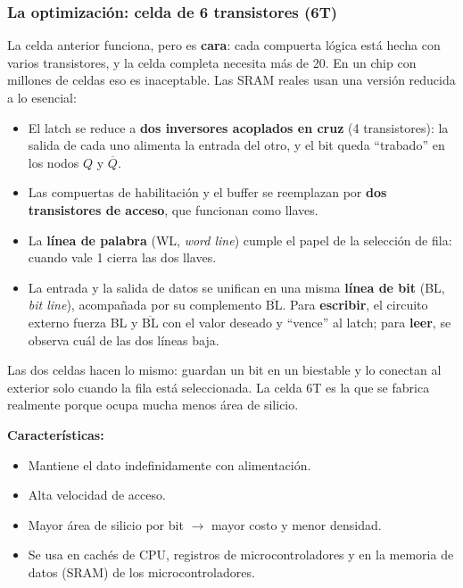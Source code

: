 
\subsubsection{La optimización: celda de 6 transistores (6T)}

La celda anterior funciona, pero es \textbf{cara}: cada compuerta lógica está hecha con varios transistores, y la celda completa necesita más de 20. En un chip con millones de celdas eso es inaceptable. Las SRAM reales usan una versión reducida a lo esencial:

\begin{itemize}
  \item El latch se reduce a \textbf{dos inversores acoplados en cruz} (4 transistores): la salida de cada uno alimenta la entrada del otro, y el bit queda ``trabado'' en los nodos $Q$ y $\overline{Q}$.
  \item Las compuertas de habilitación y el buffer se reemplazan por \textbf{dos transistores de acceso}, que funcionan como llaves.
  \item La \textbf{línea de palabra} (WL, \emph{word line}) cumple el papel de la selección de fila: cuando vale 1 cierra las dos llaves.
  \item La entrada y la salida de datos se unifican en una misma \textbf{línea de bit} (BL, \emph{bit line}), acompañada por su complemento $\overline{\text{BL}}$. Para \textbf{escribir}, el circuito externo fuerza BL y $\overline{\text{BL}}$ con el valor deseado y ``vence'' al latch; para \textbf{leer}, se observa cuál de las dos líneas baja.
\end{itemize}


\begin{notabox}
Las dos celdas hacen lo mismo: guardan un bit en un biestable y lo conectan al exterior solo cuando la fila está seleccionada. La celda 6T es la que se fabrica realmente porque ocupa mucha menos área de silicio.
\end{notabox}

\textbf{Características:}
\begin{itemize}
  \item Mantiene el dato indefinidamente con alimentación.
  \item Alta velocidad de acceso.
  \item Mayor área de silicio por bit $\rightarrow$ mayor costo y menor densidad.
  \item Se usa en cachés de CPU, registros de microcontroladores y en la memoria de datos (SRAM) de los microcontroladores.
\end{itemize}

